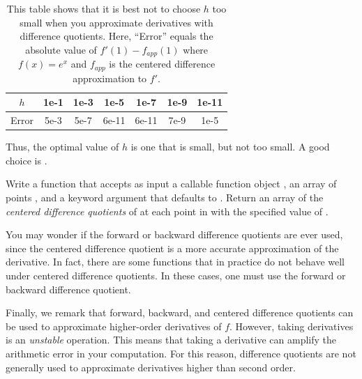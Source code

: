 \begin{table}
\begin{center}
\begin{tabular}{|c|c|c|c|c|c|c|}
    \hline
    $h$     & 1e-1 & 1e-3 & 1e-5  & 1e-7  & 1e-9 & 1e-11 \\ \hline
    Error   & 5e-3 & 5e-7 & 6e-11 & 6e-11 & 7e-9 & 1e-5  \\ \hline
\end{tabular}
\caption{This table shows that it is best not to choose $h$ too small when you approximate derivatives with difference quotients.
Here, ``Error'' equals the absolute value of $f'(1)-f_{app}(1)$ where $f(x) = e^x$ and $f_{app}$ is the centered difference approximation to $f'$.}
\label{table:approx_errors}
\end{center}
\end{table}

Thus, the optimal value of $h$ is one that is small, but not too small. A good choice is .

\begin{problem}
Write a function that accepts as input a callable function object , an array of points , and
a keyword argument  that defaults to .
Return an array of the \emph{centered difference quotients} of  at each point in  with the specified value of .
\end{problem}

You may wonder if the forward or backward difference quotients are ever used, since the centered difference quotient is a more accurate approximation of the derivative.
In fact, there are some functions that in practice do not behave well under centered difference quotients.
In these cases, one must use the forward or backward difference quotient.

Finally, we remark that forward, backward, and centered difference quotients can be used to approximate higher-order derivatives of $f$.
However, taking derivatives is an \emph{unstable} operation.
This means that taking a derivative can amplify the arithmetic error in your computation.
For this reason, difference quotients are not generally used  to approximate derivatives higher than second order.

